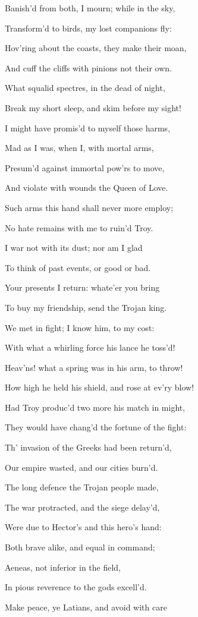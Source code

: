 Banish’d from both, I mourn; while in the sky,

Transform’d to birds, my lost companions fly:

Hov’ring about the coasts, they make their moan,

And cuff the cliffs with pinions not their own.

What squalid spectres, in the dead of night,

Break my short sleep, and skim before my sight!

I might have promis’d to myself those harms,

Mad as I was, when I, with mortal arms,

Presum’d against immortal pow’rs to move,

And violate with wounds the Queen of Love.

Such arms this hand shall never more employ;

No hate remains with me to ruin’d Troy.

I war not with its dust; nor am I glad

To think of past events, or good or bad.

Your presents I return: whate’er you bring

To buy my friendship, send the Trojan king.

We met in fight; I know him, to my cost:

With what a whirling force his lance he toss’d!

Heav’ns! what a spring was in his arm, to throw!

How high he held his shield, and rose at ev’ry blow!

Had Troy produc’d two more his match in might,

They would have chang’d the fortune of the fight:

Th’ invasion of the Greeks had been return’d,

Our empire wasted, and our cities burn’d.

The long defence the Trojan people made,

The war protracted, and the siege delay’d,

Were due to Hector’s and this hero’s hand:

Both brave alike, and equal in command;

Aeneas, not inferior in the field,

In pious reverence to the gods excell’d.

Make peace, ye Latians, and avoid with care

